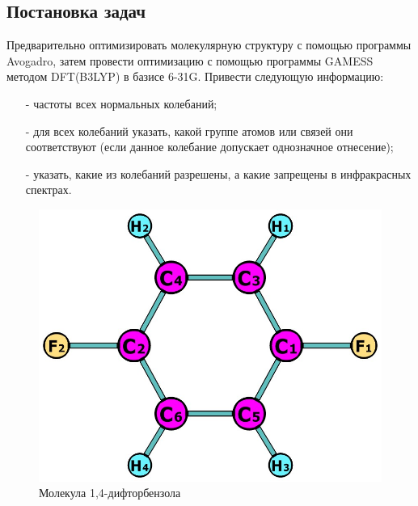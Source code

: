 \subsection{Постановка задач}
Предварительно оптимизировать молекулярную структуру с помощью программы Avogadro, затем провести оптимизацию с помощью программы GAMESS методом DFT(B3LYP) в базисе 6-31G. Привести следующую информацию: 
\begin{itemize}
    \item[-] частоты всех нормальных колебаний;
    \item[-] для всех колебаний указать, какой группе атомов или связей они соответствуют (если данное колебание допускает однозначное отнесение);
    \item[-] указать, какие из колебаний разрешены, а какие запрещены в инфракрасных спектрах.
\end{itemize}

\begin{figure}[H]
\centering
\captionsetup{justification=centering}
\includegraphics[scale=0.4]{fig/0.jpg}
\caption{Молекула 1,4-дифторбензола}
\end{figure}